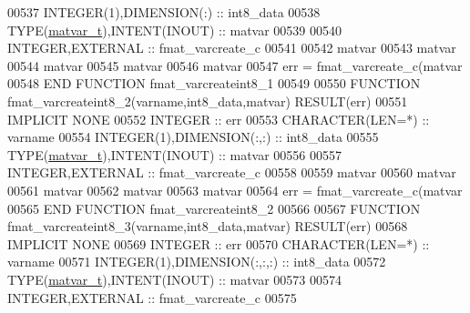 \begin{DoxyCode}
00537     \textcolor{keywordtype}{INTEGER(1)},\textcolor{keywordtype}{DIMENSION(:)}   :: int8\_data
00538     \textcolor{keywordtype}{TYPE}(\hyperlink{group___m_a_t_structmatvar__t}{matvar\_t}),\textcolor{keywordtype}{INTENT(INOUT)}    :: matvar
00539 
00540     \textcolor{keywordtype}{INTEGER},\textcolor{keywordtype}{EXTERNAL}                :: fmat\_varcreate\_c
00541 
00542     matvar%
00543     matvar%
00544     matvar%
00545     matvar%
00546     matvar%
00547     err = fmat\_varcreate\_c(matvar%
00548 \textcolor{keyword}{END FUNCTION }fmat\_varcreateint8\_1
00549 
00550 \textcolor{keyword}{FUNCTION }fmat\_varcreateint8\_2(varname,int8\_data,matvar) \textcolor{keyword}{RESULT}(err)
00551 \textcolor{keywordtype}{IMPLICIT NONE}
00552     \textcolor{keywordtype}{INTEGER}                         :: err
00553     \textcolor{keywordtype}{CHARACTER(LEN=*)}                :: varname
00554     \textcolor{keywordtype}{INTEGER(1)},\textcolor{keywordtype}{DIMENSION(:,:)} :: int8\_data
00555     \textcolor{keywordtype}{TYPE}(\hyperlink{group___m_a_t_structmatvar__t}{matvar\_t}),\textcolor{keywordtype}{INTENT(INOUT)}    :: matvar
00556 
00557     \textcolor{keywordtype}{INTEGER},\textcolor{keywordtype}{EXTERNAL}                :: fmat\_varcreate\_c
00558 
00559     matvar%
00560     matvar%
00561     matvar%
00562     matvar%
00563     matvar%
00564     err = fmat\_varcreate\_c(matvar%
00565 \textcolor{keyword}{END FUNCTION }fmat\_varcreateint8\_2
00566 
00567 \textcolor{keyword}{FUNCTION }fmat\_varcreateint8\_3(varname,int8\_data,matvar) \textcolor{keyword}{RESULT}(err)
00568 \textcolor{keywordtype}{IMPLICIT NONE}
00569     \textcolor{keywordtype}{INTEGER}                         :: err
00570     \textcolor{keywordtype}{CHARACTER(LEN=*)}                :: varname
00571     \textcolor{keywordtype}{INTEGER(1)},\textcolor{keywordtype}{DIMENSION(:,:,:)} :: int8\_data
00572     \textcolor{keywordtype}{TYPE}(\hyperlink{group___m_a_t_structmatvar__t}{matvar\_t}),\textcolor{keywordtype}{INTENT(INOUT)}    :: matvar
00573 
00574     \textcolor{keywordtype}{INTEGER},\textcolor{keywordtype}{EXTERNAL}                :: fmat\_varcreate\_c
00575 

\end{DoxyCode}
